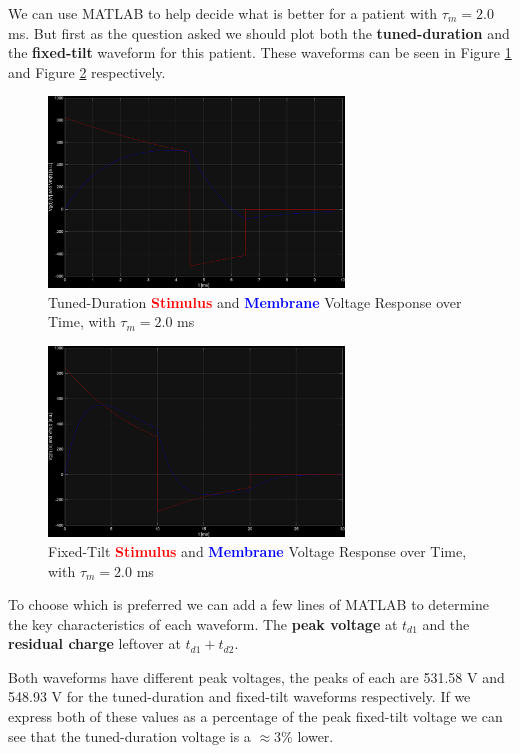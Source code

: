 \documentclass[]{report}
\begin{document}
We can use MATLAB to help decide what is better for a patient with  $\tau_m = 2.0$ ms. But first as the question asked we should plot both the \textbf{tuned-duration} and the \textbf{fixed-tilt} waveform for this patient. These waveforms can be seen in Figure \ref{fig:3} and Figure \ref{fig:4} respectively.

\begin{figure}[H]
	\centering
	\includegraphics[width=0.7\textwidth]{tau2ms_tuned_dur.png}
	\caption{\centering Tuned-Duration \textcolor{red}{\textbf{Stimulus}} and \textcolor{blue}{\textbf{Membrane}} Voltage Response over Time, with $\tau_m = 2.0$ ms}
	\label{fig:3}
\end{figure}

\begin{figure}[H]
	\centering
	\includegraphics[width=0.7\textwidth]{tau2ms_fixed_tilt.png}
	\caption{\centering Fixed-Tilt \textcolor{red}{\textbf{Stimulus}} and \textcolor{blue}{\textbf{Membrane}} Voltage Response over Time, with $\tau_m = 2.0$ ms}
	\label{fig:4}
\end{figure}

To choose which is preferred we can add a few lines of MATLAB to determine the key characteristics of each waveform. The \textbf{peak voltage} at $t_{d1}$ and the \textbf{residual charge} leftover at $t_{d1} + t_{d2}$.

Both waveforms have different peak voltages, the peaks of each are 531.58 V and 548.93 V for the tuned-duration and fixed-tilt waveforms respectively. If we express both of these values as a percentage of the peak fixed-tilt voltage we can see that the tuned-duration voltage is a $\approx 3$\% lower. 
\end{document}
